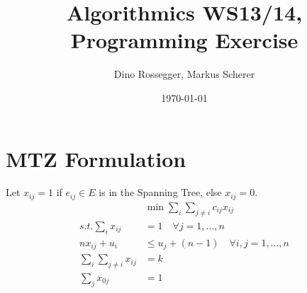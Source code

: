 \documentclass[a4paper]{article}
\title{Algorithmics WS13/14, Programming Exercise}
\author{Dino Rossegger, Markus Scherer}
\date{\today}
\begin{document}
\maketitle
\section{MTZ Formulation}
Let $x_{ij}=1$ if $e_{ij}\in E$ is in the Spanning Tree, else $x_{ij}=0$.
\begin{align}
	&\min{\sum_i \sum_{j\not =i} c_{ij}x_{ij}}\\
	s.t. \sum_{i} x_{ij} &= 1 \quad \forall j=1,\dots,n \\
	nx_{ij} + u_i &\leq u_j + (n-1)\quad \forall i,j=1,\dots,n\\
	\sum_i\sum_{j\not =i} x_{ij} &= k \\
	\sum_j x_{0j}&=1
\end{align}
\end{document}
